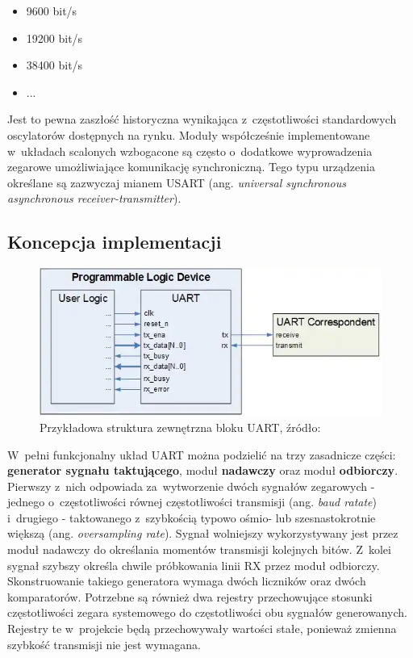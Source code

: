 \begin{itemize}
    \item 9600 bit/s
    \item 19200 bit/s
    \item 38400 bit/s
    \item ...
\end{itemize}

Jest to pewna zaszłość historyczna wynikająca z~częstotliwości standardowych oscylatorów dostępnych na rynku. Moduły współcześnie implementowane w~układach scalonych wzbogacone są często o~dodatkowe wyprowadzenia zegarowe umożliwiające komunikację synchroniczną. Tego typu urządzenia określane są zazwyczaj mianem USART (ang. \textit{universal synchronous asynchronous receiver-transmitter}).


\subsection{Koncepcja implementacji}

\begin{figure}[ht]
    \centering
    \includegraphics[scale=0.6]{img/uart_core.png}
    \captionsetup{format=plain,justification=centering}
    \caption{Przykładowa struktura zewnętrzna bloku UART, źródło: \cite{uart_core}}
    \label{uart-core}
\end{figure}

W~pełni funkcjonalny układ UART można podzielić na trzy zasadnicze części: \textbf{generator sygnału taktującego}, moduł \textbf{nadawczy} oraz moduł \textbf{odbiorczy}. Pierwszy z~nich odpowiada za~wytworzenie dwóch sygnałów zegarowych - jednego o~częstotliwości równej częstotliwości transmisji (ang. \textit{baud ratate}) i~drugiego - taktowanego z~szybkością typowo ośmio- lub szesnastokrotnie większą (ang. \textit{oversampling rate}). Sygnał wolniejszy wykorzystywany jest przez moduł nadawczy do określania momentów transmisji kolejnych bitów. Z~kolei sygnał szybszy określa chwile próbkowania linii RX przez moduł odbiorczy. Skonstruowanie takiego generatora wymaga dwóch liczników oraz dwóch komparatorów. Potrzebne są również dwa rejestry przechowujące stosunki częstotliwości zegara systemowego do częstotliwości obu sygnałów generowanych. Rejestry te w~projekcie będą przechowywały wartości stałe, ponieważ zmienna szybkość transmisji nie jest wymagana.

